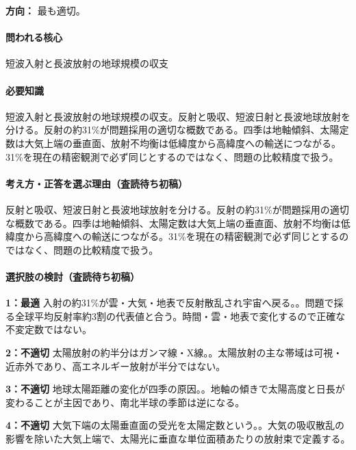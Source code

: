 \noindent\textbf{方向：} 最も適切。\par

\paragraph{問われる核心} 短波入射と長波放射の地球規模の収支

\paragraph{必要知識} 短波入射と長波放射の地球規模の収支。反射と吸収、短波日射と長波地球放射を分ける。反射の約31\%が問題採用の適切な概数である。四季は地軸傾斜、太陽定数は大気上端の垂直面、放射不均衡は低緯度から高緯度への輸送につながる。31\%を現在の精密観測で必ず同じとするのではなく、問題の比較精度で扱う。

\paragraph{考え方・正答を選ぶ理由（査読待ち初稿）} 反射と吸収、短波日射と長波地球放射を分ける。反射の約31\%が問題採用の適切な概数である。四季は地軸傾斜、太陽定数は大気上端の垂直面、放射不均衡は低緯度から高緯度への輸送につながる。31\%を現在の精密観測で必ず同じとするのではなく、問題の比較精度で扱う。

\paragraph{選択肢の検討（査読待ち初稿）}\mbox{}\par

\noindent\textbf{1：最適} 入射の約31\%が雲・大気・地表で反射散乱され宇宙へ戻る。。問題で採る全球平均反射率約3割の代表値と合う。時間・雲・地表で変化するので正確な不変定数ではない。\par

\noindent\textbf{2：不適切} 太陽放射の約半分はガンマ線・X線。。太陽放射の主な帯域は可視・近赤外であり、高エネルギー放射が半分ではない。\par

\noindent\textbf{3：不適切} 地球太陽距離の変化が四季の原因。。地軸の傾きで太陽高度と日長が変わることが主因であり、南北半球の季節は逆になる。\par

\noindent\textbf{4：不適切} 大気下端の太陽垂直面の受光を太陽定数という。。大気の吸収散乱の影響を除いた大気上端で、太陽光に垂直な単位面積あたりの放射束で定義する。\par

